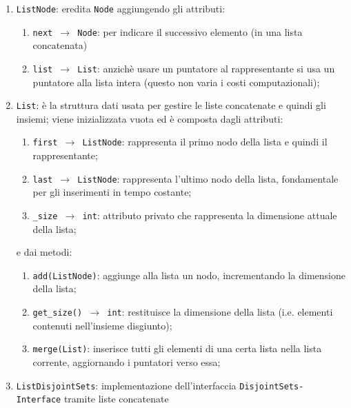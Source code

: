 \begin{enumerate}
      \item \texttt{ListNode}: eredita \texttt{Node} aggiungendo gli attributi:
            \begin{enumerate}
                  \item \texttt{next $\rightarrow$ Node}: per indicare il successivo elemento (in una lista concatenata)
                  \item \texttt{list $\rightarrow$ List}: anzichè usare un puntatore al rappresentante si usa un puntatore alla lista
                        intera (questo non varia i costi computazionali);
            \end{enumerate}
            \newpage
      \item \texttt{List}: è la struttura dati usata per gestire le liste concatenate e quindi gli insiemi;
            viene inizializzata vuota ed è composta dagli attributi:
            \begin{enumerate}
                  \item \texttt{first $\rightarrow$ ListNode}: rappresenta il primo nodo della lista e quindi il rappresentante;
                  \item \texttt{last $\rightarrow$ ListNode}: rappresenta l'ultimo nodo della lista, fondamentale per gli inserimenti
                        in tempo costante;
                  \item \texttt{\_size $\rightarrow$ int}: attributo privato che rappresenta la dimensione attuale della lista;
            \end{enumerate}
            e dai metodi:
            \begin{enumerate}[resume]
                  \item \texttt{add(ListNode)}: aggiunge alla lista un nodo, incrementando la dimensione della lista;
                  \item \texttt{get\_size() $\rightarrow$ int}: restituisce la dimensione della lista (i.e. elementi
                        contenuti nell'insieme disgiunto);
                  \item \texttt{merge(List)}: inserisce tutti gli elementi di una certa lista nella lista corrente,
                        aggiornando i puntatori verso essa;
            \end{enumerate}
      \item \texttt{ListDisjointSets}: implementazione dell'interfaccia \texttt{DisjointSets-\linebreak Interface} tramite liste concatenate

\end{enumerate}
